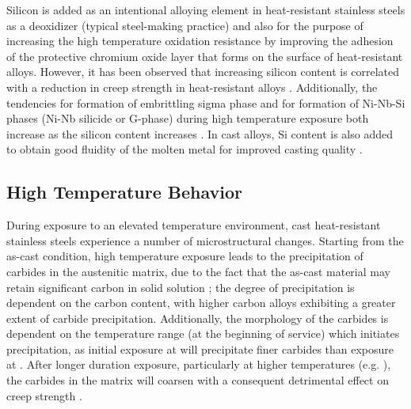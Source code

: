 Silicon is added as an intentional alloying element in heat-resistant stainless steels as a deoxidizer (typical steel-making practice) and also for the purpose of increasing the high temperature oxidation resistance \cite{kane_evolution_1991} by improving the adhesion of the protective chromium oxide layer that forms on the surface of heat-resistant alloys. However, it has been observed that increasing silicon content is correlated with a reduction in creep strength in heat-resistant alloys \cite{avery_cast_1969}. Additionally, the tendencies for formation of embrittling sigma phase and for formation of Ni-Nb-Si phases (Ni-Nb silicide or G-phase) during high temperature exposure both increase as the silicon content increases \cite{pedro_ibanez_effects_1993,davis_metallurgy_1994}. In cast alloys, Si content is also added to obtain good fluidity of the molten metal for improved casting quality \cite{blair_cast_stainless_1990}.

\subsection{High Temperature Behavior}
During exposure to an elevated temperature environment, cast heat-resistant stainless steels experience a number of microstructural changes. Starting from the as-cast condition, high temperature exposure leads to the precipitation of carbides in the austenitic matrix, due to the fact that the as-cast material may retain significant carbon in solid solution \cite{avery_cast_1969}; the degree of precipitation is dependent on the carbon content, with higher carbon alloys exhibiting a greater extent of carbide precipitation. Additionally, the morphology of the carbides is dependent on the temperature range (at the beginning of service) which initiates precipitation, as initial exposure at  will precipitate finer carbides than exposure at  \cite{avery_cast_1969}. After longer duration exposure, particularly at higher temperatures (e.g. ), the carbides in the matrix will coarsen with a consequent detrimental effect on creep strength \cite{avery_cast_1969}. 

